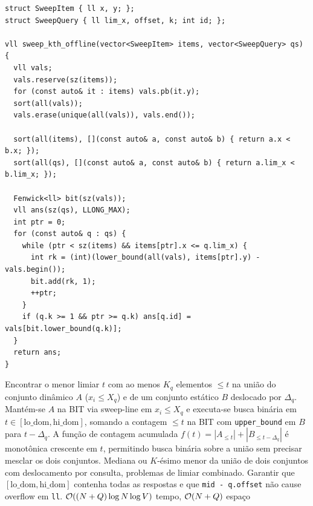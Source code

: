 \begin{lstlisting}
struct SweepItem { ll x, y; };
struct SweepQuery { ll lim_x, offset, k; int id; };

vll sweep_kth_offline(vector<SweepItem> items, vector<SweepQuery> qs) {
  vll vals;
  vals.reserve(sz(items));
  for (const auto& it : items) vals.pb(it.y);
  sort(all(vals));
  vals.erase(unique(all(vals)), vals.end());

  sort(all(items), [](const auto& a, const auto& b) { return a.x < b.x; });
  sort(all(qs), [](const auto& a, const auto& b) { return a.lim_x < b.lim_x; });

  Fenwick<ll> bit(sz(vals));
  vll ans(sz(qs), LLONG_MAX);
  int ptr = 0;
  for (const auto& q : qs) {
    while (ptr < sz(items) && items[ptr].x <= q.lim_x) {
      int rk = (int)(lower_bound(all(vals), items[ptr].y) - vals.begin());
      bit.add(rk, 1);
      ++ptr;
    }
    if (q.k >= 1 && ptr >= q.k) ans[q.id] = vals[bit.lower_bound(q.k)];
  }
  return ans;
}
\end{lstlisting}

\algobox
  {Encontrar o menor limiar $t$ com ao menos $K_q$ elementos $\le t$ na união do conjunto dinâmico $A$ ($x_i \le X_q$) e de um conjunto estático $B$ deslocado por $\Delta_q$.}
  {Mantém-se $A$ na BIT via sweep-line em $x_i \le X_q$ e executa-se busca binária em $t \in [\text{lo\_dom}, \text{hi\_dom}]$, somando a contagem $\le t$ na BIT com \texttt{upper\_bound} em $B$ para $t - \Delta_q$.}
  {A função de contagem acumulada $f(t) = |A_{\le t}| + |B_{\le t - \Delta_q}|$ é monotônica crescente em $t$, permitindo busca binária sobre a união sem precisar mesclar os dois conjuntos.}
  {Mediana ou $K$-ésimo menor da união de dois conjuntos com deslocamento por consulta, problemas de limiar combinado.}
  {Garantir que $[\text{lo\_dom}, \text{hi\_dom}]$ contenha todas as respostas e que \texttt{mid - q.offset} não cause overflow em \texttt{ll}.}
  {$\mathcal{O}((N + Q) \log N \log V)$ tempo, $\mathcal{O}(N + Q)$ espaço}

